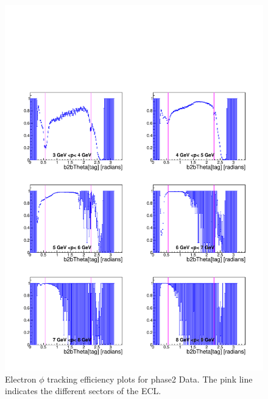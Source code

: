 \documentclass[a4paper,11pt,twosided,final,german,openbib,pdftex,listof=totoc,bibliography=totoc]{scrbook}
\begin{document}
\begin{appendix}
\begin{figure}[!htbp]
	\centering
	\includegraphics[width=\textwidth]{Plots/master/xPMThetaem_Data}
	\caption[Momentum $\theta$ Electron Efficiency Phase2 Data]{Electron $\phi$ tracking efficiency plots for phase2 Data. The pink line indicates the different sectors of the ECL.}
	\label{plt:PMThetaem_Data}
\end{figure}



\end{appendix}
\end{document}
